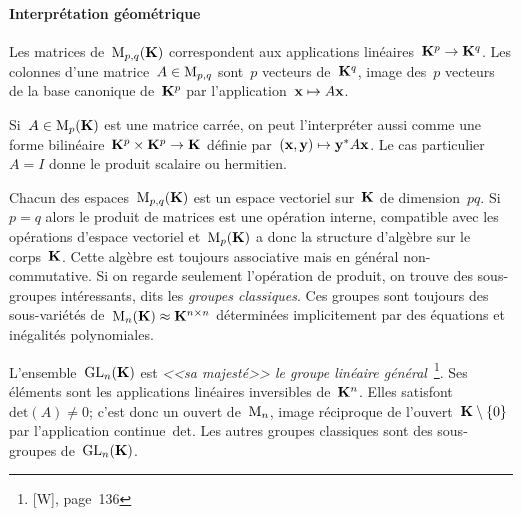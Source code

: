 \paragraph{Interprétation géométrique}

Les matrices de~$\mathrm{M}_{p,q}(\mathbf{K})$ correspondent aux applications
linéaires~$\mathbf{K}^p\to\mathbf{K}^q$.  Les colonnes d'une matrice~$A\in\mathrm{M}_{p,q}$ sont~$p$
vecteurs de~$\mathbf{K}^q$, image des~$p$ vecteurs de la base canonique de~$\mathbf{K}^p$ par
l'application~$\mathbf{x}\mapsto A\mathbf{x}$.

%

Si~$A\in\mathrm{M}_p(\mathbf{K})$ est une matrice carrée, on peut l'interpréter aussi comme
une forme bilinéaire~$\mathbf{K}^p\times\mathbf{K}^p\to\mathbf{K}$ définie par~$(\mathbf{x},\mathbf{y})\mapsto
\mathbf{y}^*A\mathbf{x}$.  Le cas particulier~$A=I$ donne le produit scalaire ou hermitien.

Chacun des espaces~$\mathrm{M}_{p,q}(\mathbf{K})$ est un espace vectoriel sur~$\mathbf{K}$ de
dimension~$pq$.  Si~$p=q$ alors le produit de matrices est une opération
interne, compatible avec les opérations d'espace vectoriel et~$\mathrm{M}_p(\mathbf{K})$ a
donc la structure d'algèbre sur le corps~$\mathbf{K}$.  Cette algèbre est toujours
associative mais en général non-commutative.  Si on regarde seulement
l'opération de produit, on trouve des sous-groupes intéressants, dits les
\emph{groupes classiques}.  Ces groupes sont toujours des sous-variétés
de~$\mathrm{M}_n(\mathbf{K})\approx\mathbf{K}^{n\times n}$ déterminées implicitement par des
équations et inégalités polynomiales.

L'ensemble~$\mathrm{GL}_n(\mathbf{K})$ est \emph{<<sa majesté>> le groupe linéaire
général}~\footnote{[W], page~136}.
Ses éléments sont les applications linéaires inversibles de~$\mathbf{K}^n$.  Elles
satisfont~$\textrm{det}(A)\neq 0$; c'est donc un ouvert de~$\mathrm{M}_n$,
image réciproque de l'ouvert~$\mathbf{K}\setminus\{0\}$ par l'application
continue~$\textrm{det}$.
Les autres groupes classiques sont des sous-groupes de~$\mathrm{GL}_n(\mathbf{K})$.

